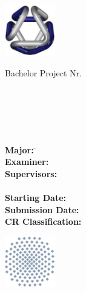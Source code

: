 \thispagestyle{empty}
\begin{center}
\begin{minipage}{0.15\linewidth}
	\includegraphics[width=2.2cm]{logos/logo-university-vis.pdf}
\end{minipage}
\begin{minipage}{0.75\linewidth}
\facultyTwoInformation
\end{minipage}

\vspace{4.5cm}
\hspace{0.5cm}
\begin{minipage}{10cm}
\centering
{\Large
Bachelor Project Nr. \projectNumberTwo\\
\vspace{0.4cm}
{\bf \titleOfThesisOne\\
\titleOfThesisTwo\\
\titleOfThesisThree\\}
\vspace{0.6cm}
\authorOfThesis
}
\end{minipage}
\\
\vspace{3cm}
\parbox{2.5cm}{
	\begin{tabbing}
		{\bf Major:} \hspace{2.5cm}
			\=\majorOne\\[2mm]
		{\bf Examiner:}
			\>\reviewerOne\\[2mm]
		{\bf Supervisors:}
			\>\supervisorOne\\[2mm]
			\>\supervisorTwo\\[2mm]
		{\bf Starting Date:}
			\>\startingDate\\[2mm]
		{\bf Submission Date:}
			\>\submissionDate\\[2mm]
		{\bf CR Classification:}
			\>\crClassification\\
	\end{tabbing}
}

\vspace{1cm}
\begin{minipage}{0.15\linewidth}
	\includegraphics[width=2.2cm]{logos/logo-university-stuttgart.pdf}
\end{minipage}
\begin{minipage}{0.6\linewidth}
{\huge \bf
\universityTwo
}
\end{minipage}


\end{center}
